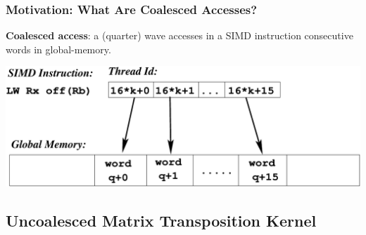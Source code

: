 \documentclass{beamer}
\begin{document}
\begin{frame}[fragile,t]
  \frametitle{Motivation: What Are Coalesced Accesses?} 

\textbf{Coalesced access}: a (quarter) wave accesses in a
SIMD instruction consecutive words in global-memory.\bigskip

\includegraphics[height=20ex]{img/day2/CoalescedGPU}

\end{frame}

\subsection{Uncoalesced Matrix Transposition Kernel}
\end{document}
